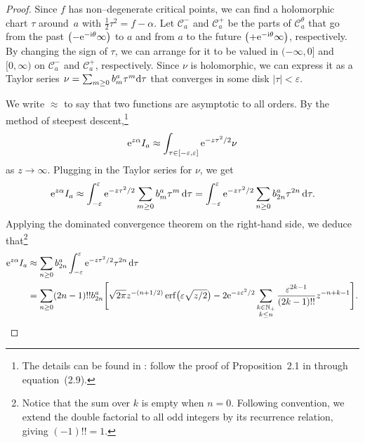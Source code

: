 \documentclass[pdftex]{sigma}
\numberwithin{equation}{section}
\begin{document}
\begin{proof}
Since $f$ has non--degenerate critical points, we can find a holomorphic chart $\tau$ around~$a$ with $\frac{1}{2} \tau^2 = f - \alpha$. Let $\mathcal{C}^-_a$ and $\mathcal{C}^+_a$ be the parts of $\mathcal{C}_a^\theta$ that go from the past $\bigl(-{\rm e}^{-{\rm i}\theta}\infty\bigr)$ to $a$ and from $a$ to the future $\bigl(+{\rm e}^{-{\rm i}\theta}\infty\bigr)$, respectively. By changing the sign of $\tau$, we can arrange for it to be valued in $(-\infty, 0]$ and $[0,\infty)$ on $\mathcal{C}^-_a$ and $\mathcal{C}^+_a$, respectively. Since $\nu$ is holomorphic, we can express it as a Taylor series
$\nu = \sum_{m \ge 0} b_m^a \tau^m{\rm d}\tau$
that converges in some disk $|\tau| < \varepsilon$.

We write $\approx$ to say that two functions are asymptotic to all orders. By the method of steepest descent,\footnote{The details can be found in \cite{miller2006applied}: follow the proof of Proposition~2.1 in through equation~(2.9).}
\[ {\rm e}^{z \alpha} I_a \approx \int_{\tau \in [-\varepsilon, \varepsilon]} {\rm e}^{-z\tau^2/2} \nu \]
as $z \to \infty$. Plugging in the Taylor series for $\nu$, we get
\begin{equation*}
{\rm e}^{z \alpha} I_a \approx \int_{-\varepsilon}^\varepsilon {\rm e}^{-z\tau^2/2} \sum_{m \ge 0} b_m^a \tau^m \,{\rm d}\tau = \int_{-\varepsilon}^\varepsilon {\rm e}^{-z\tau^2/2} \sum_{n \ge 0} b_{2n}^a \tau^{2n}\, {\rm d}\tau.
\end{equation*}
Applying the dominated convergence theorem on the right-hand side, we deduce that\footnote{Notice that the sum over $k$ is empty when $n = 0$. Following convention, we extend the double factorial to all odd integers by its recurrence relation, giving $(-1)!! = 1$.}
\begin{align*}
{\rm e}^{z \alpha} I_a & \approx \sum_{n \ge 0} b_{2n}^a \int_{-\varepsilon}^\varepsilon {\rm e}^{-z\tau^2/2} \tau^{2n} \,{\rm d}\tau \\
& = \sum_{n \ge 0} (2n-1)!! b_{2n}^a \Bigg[ \sqrt{2\pi} z^{-(n+1/2)} \operatorname{erf}\bigl(\varepsilon \sqrt{z/2}\bigr) - 2{\rm e}^{-z\varepsilon^2/2} \sum_{\substack{k \in \mathbb{N}_+ \\ k \le n}} \frac{\varepsilon^{2k-1}}{(2k-1)!!} z^{-n+k-1} \Bigg].
\end{align*}


\end{proof}
\end{document}
